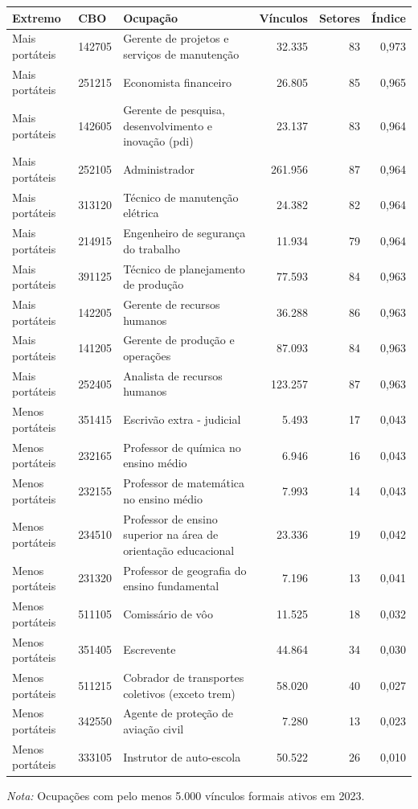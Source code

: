 \providecommand{\toprule}{\hline\hline}
\providecommand{\midrule}{\hline}
\providecommand{\bottomrule}{\hline\hline}
\providecommand{\addlinespace}[1][]{}
{\small
\renewcommand{\arraystretch}{1.12}
\begin{tabular}{llp{5.8cm}rrr}
\toprule
Extremo & CBO & Ocupação & Vínculos & Setores & Índice \\
\midrule
Mais portáteis & 142705 & Gerente de projetos e serviços de manutenção & 32.335 & 83 & 0,973 \\
Mais portáteis & 251215 & Economista financeiro & 26.805 & 85 & 0,965 \\
Mais portáteis & 142605 & Gerente de pesquisa, desenvolvimento e inovação (pdi) & 23.137 & 83 & 0,964 \\
Mais portáteis & 252105 & Administrador & 261.956 & 87 & 0,964 \\
Mais portáteis & 313120 & Técnico de manutenção elétrica & 24.382 & 82 & 0,964 \\
Mais portáteis & 214915 & Engenheiro de segurança do trabalho & 11.934 & 79 & 0,964 \\
Mais portáteis & 391125 & Técnico de planejamento de produção & 77.593 & 84 & 0,963 \\
Mais portáteis & 142205 & Gerente de recursos humanos & 36.288 & 86 & 0,963 \\
Mais portáteis & 141205 & Gerente de produção e operações & 87.093 & 84 & 0,963 \\
Mais portáteis & 252405 & Analista de recursos humanos & 123.257 & 87 & 0,963 \\
\addlinespace[3pt]
Menos portáteis & 351415 & Escrivão extra - judicial & 5.493 & 17 & 0,043 \\
Menos portáteis & 232165 & Professor de química no ensino médio & 6.946 & 16 & 0,043 \\
Menos portáteis & 232155 & Professor de matemática no ensino médio & 7.993 & 14 & 0,043 \\
Menos portáteis & 234510 & Professor de ensino superior na área de orientação educacional & 23.336 & 19 & 0,042 \\
Menos portáteis & 231320 & Professor de geografia do ensino fundamental & 7.196 & 13 & 0,041 \\
Menos portáteis & 511105 & Comissário de vôo & 11.525 & 18 & 0,032 \\
Menos portáteis & 351405 & Escrevente & 44.864 & 34 & 0,030 \\
Menos portáteis & 511215 & Cobrador de transportes coletivos (exceto trem) & 58.020 & 40 & 0,027 \\
Menos portáteis & 342550 & Agente de proteção de aviação civil & 7.280 & 13 & 0,023 \\
Menos portáteis & 333105 & Instrutor de auto-escola & 50.522 & 26 & 0,010 \\
\bottomrule
\end{tabular}
\vspace{2pt}
\par{\footnotesize \textit{Nota:} Ocupações com pelo menos 5.000 vínculos formais ativos em 2023.}
}
